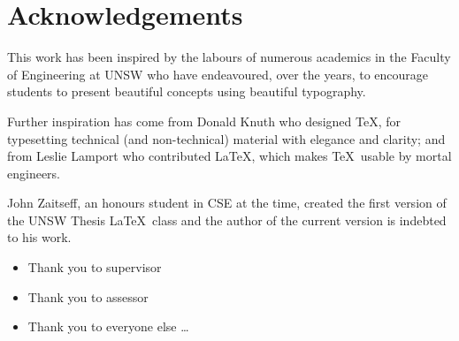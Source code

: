 \chapter*{Acknowledgements}\label{ack}

This work has been inspired by the labours of numerous academics in
the Faculty of Engineering at UNSW who have endeavoured, over the years, to
encourage students to present beautiful concepts using beautiful
typography.

Further inspiration has come from Donald Knuth who designed \TeX, for
typesetting technical (and non-technical) material with elegance and
clarity; and from Leslie Lamport who contributed \LaTeX, which makes
\TeX\ usable by mortal engineers.

John Zaitseff, an honours student in CSE at the time, created the
first version of the UNSW Thesis \LaTeX\ class and the author of the
current version is indebted to his work.

\begin{itemize}
  \item Thank you to supervisor
  \item Thank you to assessor
  \item Thank you to everyone else
\ldots
\end{itemize}